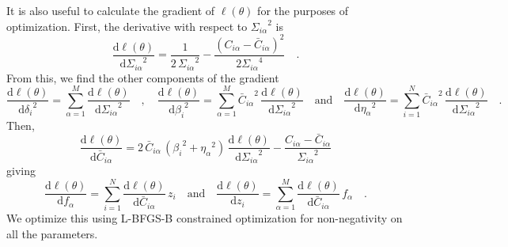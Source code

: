 \documentclass[12pt,preprint]{aastex}
\newcommand{\dd}{\mathrm{d}}
\newcommand{\nstars}{\ensuremath{M}}
\newcommand{\nobs}  {\ensuremath{N}}
\newcommand{\st}    {\ensuremath{\alpha}}
\newcommand{\obs}   {\ensuremath{i}}
\newcommand{\jabs}  {\ensuremath{\delta_\obs}}
\newcommand{\vs}    {\ensuremath{\eta_\st}}
\newcommand{\vo}    {\ensuremath{\beta_\obs}}
\newcommand{\sig}   {\ensuremath{\Sigma_{\obs\st}}}
\newcommand{\fstar} {\ensuremath{f_\st}}
\newcommand{\fobs}  {\ensuremath{z_\obs}}
\newcommand{\Cobs}  {\ensuremath{C_{\obs\st}}}
\newcommand{\Cmod}  {\ensuremath{\bar{C}_{\obs\st}}}
\begin{document}
It is also useful to calculate the gradient of $\ell (\theta)$ for the
purposes of optimization. First, the derivative with respect to $\sig^2$ is
\begin{equation}
    \frac{\dd \ell (\theta)}{\dd \sig^2} =
        \frac{1}{2\,\sig^2} - \frac{(\Cobs - \Cmod)^2}{2 \sig^4} \quad .
\end{equation}
From this, we find the other components of the gradient
\begin{equation}
    \frac{\dd \ell (\theta)}{\dd \jabs^2} = \sum_{\st=1}^\nstars
        \frac{\dd \ell (\theta)}{\dd \sig^2}
    \quad , \quad
    \frac{\dd \ell (\theta)}{\dd \vo^2} = \sum_{\st=1}^\nstars
        \Cmod^2 \, \frac{\dd \ell (\theta)}{\dd \sig^2}
    \quad \mathrm{and} \quad
    \frac{\dd \ell (\theta)}{\dd \vs^2} = \sum_{\obs=1}^\nobs
        \Cmod^2 \, \frac{\dd \ell (\theta)}{\dd \sig^2}
    \quad .
\end{equation}
Then,
\begin{equation}
    \frac{\dd \ell(\theta)}{\dd \Cmod} =
        2 \, \Cmod \, \left (\vo^2 + \vs^2\right ) \,
        \frac{\dd \ell (\theta)}{\dd \sig^2}
        - \frac{\Cobs - \Cmod}{\sig^2}
\end{equation}
giving
\begin{equation}
    \frac{\dd \ell (\theta)}{\dd \fstar} = \sum_{\obs=1}^\nobs
        \frac{\dd \ell(\theta)}{\dd \Cmod} \, \fobs
    \quad \mathrm{and} \quad
    \frac{\dd \ell (\theta)}{\dd \fobs} = \sum_{\st=1}^\nstars
        \frac{\dd \ell(\theta)}{\dd \Cmod} \, \fstar
    \quad .
\end{equation}
We optimize this using L-BFGS-B constrained optimization for non-negativity
on all the parameters.


\end{document}
